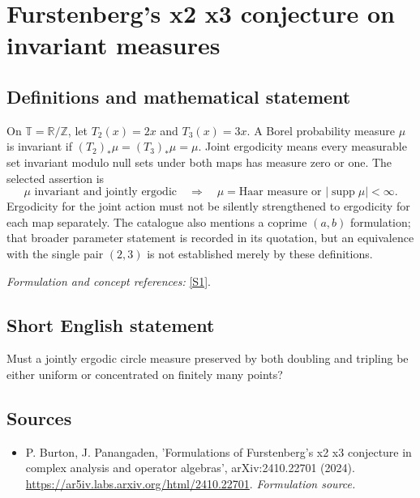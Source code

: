 \documentclass[11pt]{article}
\begin{document}
\section*{\texorpdfstring{Furstenberg's x2 x3 conjecture on invariant measures}{Furstenberg's x2 x3 conjecture on invariant measures}}\label{statement}
\subsection{Definitions and mathematical statement}
On $\mathbb T={\mathbb{R}}/{\mathbb{Z}}$, let $T_2(x)=2x$ and $T_3(x)=3x$. A Borel probability measure $\mu$ is invariant if $(T_2)_*\mu=(T_3)_*\mu=\mu$. Joint ergodicity means every measurable set invariant modulo null sets under both maps has measure zero or one. The selected assertion is
\[
 \mu\text{ invariant and jointly ergodic}
 \quad\Longrightarrow\quad
 \mu=\text{Haar measure or }|\operatorname{supp}\mu|<\infty.
\]
Ergodicity for the joint action must not be silently strengthened to ergodicity for each map separately. The catalogue also mentions a coprime $(a,b)$ formulation; that broader parameter statement is recorded in its quotation, but an equivalence with the single pair $(2,3)$ is not established merely by these definitions.
\par\smallskip\textit{Formulation and concept references:} \href{https://ar5iv.labs.arxiv.org/html/2410.22701}{[S1]}.

\subsection{Short English statement}
Must a jointly ergodic circle measure preserved by both doubling and tripling be either uniform or concentrated on finitely many points?
\subsection{Sources}
\begin{itemize}
\item[S1]P. Burton, J. Panangaden, 'Formulations of Furstenberg's x2 x3 conjecture in complex analysis and operator algebras', arXiv:2410.22701 (2024).
\url{https://ar5iv.labs.arxiv.org/html/2410.22701}.
\textit{Formulation source.}
\end{itemize}
\end{document}
